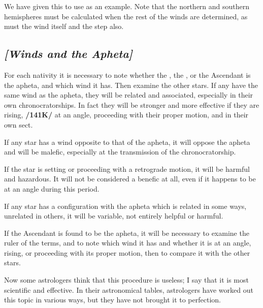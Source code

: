 We have given this to use as an example. Note that the northern and southern hemispheres must be calculated when the rest of the winds are determined, as must the wind itself and the step also.

\subsection{\textit{[Winds and the Apheta]}}
For each nativity it is necessary to note whether the \Sun, the \Moon, or the Ascendant is the apheta, and which wind it has. Then examine the other stars. If any have the same wind as the apheta, they will be related and associated, especially in their own chronocratorships. In fact they will be stronger and more effective if they are rising, \textbf{/141K/} at an angle, proceeding with their proper motion, and in their own sect.

If any star has a wind opposite to that of the apheta, it will oppose the apheta and will be malefic, especially at the transmission of the chronocratorship. 

If the star is setting or proceeding with a retrograde
motion, it will be harmful and hazardous. It will not be considered a benefic at all, even if it happens to be
at an angle during this period. 

If any star has a configuration with the apheta which is related in some ways, unrelated in others, it will be variable, not entirely helpful or harmful. 

If the Ascendant is found to be the apheta, it will be necessary to examine the ruler of the terms, and to note which wind it has and whether it is at an angle, rising, or proceeding with its proper motion, then to compare it with the other stars.

Now some astrologers think that this procedure is useless; I say that it is most scientific and effective. In their astronomical tables, astrologers have worked out this topic in various ways, but they have not brought it to perfection.

\newpage
